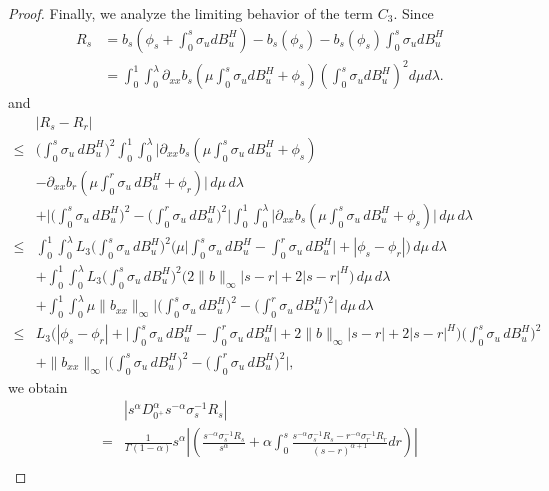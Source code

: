 \documentclass[10pt,a4paper]{amsart}
\begin{document}
\begin{proof}
Finally, we analyze the limiting behavior of the term $C_3$. Since 
\begin{align*}
    R_s&=b_s\left(\phi_s+\int_0^s \sigma_udB^H_u\right)-b_s(\phi_s)-b_s(\phi_s)\int_0^s \sigma_udB^H_u\\
    &=\int_0^1 \int_0^\lambda \partial_{xx}b_s(\mu\int_0^s \sigma_udB^H_u+\phi_s) \left(\int_0^s \sigma_udB^H_u\right)^2 d\mu d\lambda.
\end{align*}
and
\begin{align*}
&|R_s - R_r| \\
\leq &
  \bigg(\int_0^s \sigma_u\, dB^H_u\bigg)^2 
  \int_0^1 \int_0^\lambda 
  \Big|
     \partial_{xx}b_s\!\left(\mu \int_0^s \sigma_u\, dB^H_u + \phi_s\right)\\
     &- \partial_{xx}b_r\!\left(\mu \int_0^r \sigma_u\, dB^H_u + \phi_r\right)
  \Big| \, d\mu\, d\lambda \\
& + 
  \Bigg|
     \bigg(\int_0^s \sigma_u\, dB^H_u\bigg)^2 
     - \bigg(\int_0^r \sigma_u\, dB^H_u\bigg)^2
  \Bigg| 
  \int_0^1 \int_0^\lambda 
     \Big|\partial_{xx}b_s\!\left(\mu \int_0^s \sigma_u\, dB^H_u + \phi_s\right)\Big| 
  \, d\mu\, d\lambda \\[1ex]
\leq  &
  \int_0^1 \int_0^\lambda 
     L_3 \bigg(\int_0^s \sigma_u\, dB^H_u\bigg)^2 
     \Big(
        \mu\Big|\int_0^s \sigma_u\, dB^H_u - \int_0^r \sigma_u\, dB^H_u\Big|
        + |\phi_s - \phi_r|
     \Big)\, d\mu\, d\lambda \\
& +
  \int_0^1 \int_0^\lambda 
     L_3 \bigg(\int_0^s \sigma_u\, dB^H_u\bigg)^2 
     \Big(
        2\|b\|_\infty |s-r| + 2|s-r|^H
     \Big)\, d\mu\, d\lambda \\
& +
  \int_0^1 \int_0^\lambda 
     \mu \|b_{xx}\|_\infty 
     \Bigg|
        \bigg(\int_0^s \sigma_u\, dB^H_u\bigg)^2 
        - \bigg(\int_0^r \sigma_u\, dB^H_u\bigg)^2
     \Bigg| \, d\mu\, d\lambda \\[1ex]
\leq &
  L_3 \Big(
        |\phi_s - \phi_r| 
        + \Big|\int_0^s \sigma_u\, dB^H_u - \int_0^r \sigma_u\, dB^H_u\Big|
        + 2\|b\|_\infty |s-r|
        + 2|s-r|^H
     \Big)
     \bigg(\int_0^s \sigma_u\, dB^H_u\bigg)^2 \\
& + 
  \|b_{xx}\|_\infty 
  \Bigg|
     \bigg(\int_0^s \sigma_u\, dB^H_u\bigg)^2 
     - \bigg(\int_0^r \sigma_u\, dB^H_u\bigg)^2
  \Bigg|,
\end{align*}
we obtain
\begin{align*}
     & |s^{\alpha}D_{0^+}^\alpha s^{-\alpha} \sigma_s^{-1}R_s|\\
     =&\frac{1}{\Gamma(1-\alpha)}  s^{\alpha}\left|\left( \frac{ s^{-\alpha} \sigma_s^{-1}R_s}{s^\alpha} + \alpha \int_0^s \frac{ s^{-\alpha} \sigma_s^{-1}R_s -  r^{-\alpha} \sigma_r^{-1}R_r}{(s - r)^{\alpha+1}}  dr \right)\right|\\

\end{align*}
\end{proof}
\end{document}

